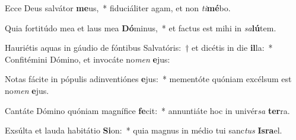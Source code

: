 \item Ecce Deus salvátor \textbf{me}us,~* fiduciáliter agam, et non \textit{ti}\textbf{mé}bo.
\item Quia fortitúdo mea et laus mea \textbf{Dó}minus,~* et factus est mihi in \textit{sa}\textbf{lú}tem.
\item Hauriétis aquas in gáudio de fóntibus Salvatóris:~† et dicétis in die \textbf{il}la:~* Confitémini Dómino, et invocáte no\textit{men} \textbf{e}jus:
\item Notas fácite in pópulis adinventiónes \textbf{e}jus:~* mementóte quóniam excélsum est no\textit{men} \textbf{e}jus.
\item Cantáte Dómino quóniam magnífice \textbf{fe}cit:~* annuntiáte hoc in univér\textit{sa} \textbf{ter}ra.
\item Exsúlta et lauda habitátio \textbf{Si}on:~* quia magnus in médio tui sanc\textit{tus} \textbf{Is}\textbf{ra}el.
